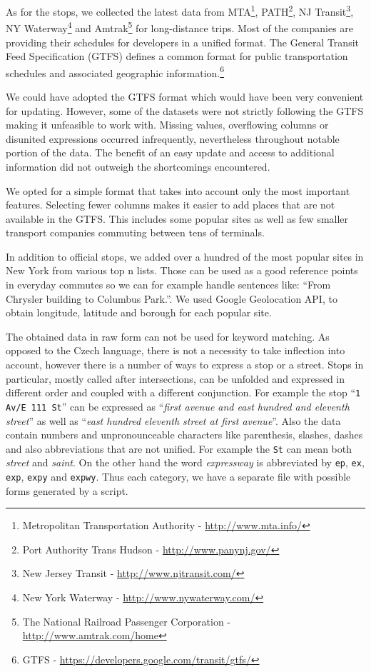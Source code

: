 As for the stops, we collected the latest data from
MTA\footnote{Metropolitan Transportation Authority - \url{http://www.mta.info/}},
PATH\footnote{Port Authority Trans Hudson - \url{http://www.panynj.gov/}},
NJ Transit\footnote{New Jersey Transit - \url{http://www.njtransit.com/}},
NY Waterway\footnote{New York Waterway - \url{http://www.nywaterway.com/}} and
Amtrak\footnote{The National Railroad Passenger Corporation - \url{http://www.amtrak.com/home}} for long-distance trips.
Most of the companies are providing their schedules for developers in a unified format.
The General Transit Feed Specification (GTFS) defines a common format for public transportation schedules and associated geographic information.\footnote{GTFS - \url{https://developers.google.com/transit/gtfs/}}

We could have adopted the GTFS format which would have been very convenient for updating.
However, some of the datasets were not strictly following the GTFS making it unfeasible to work with.
Missing values, overflowing columns or disunited expressions occurred infrequently, nevertheless throughout notable portion of the data.
The benefit of an easy update and access to additional information did not outweigh the shortcomings encountered.

We opted for a simple format that takes into account only the most important features.
Selecting fewer columns makes it easier to add places that are not available in the GTFS.
This includes some popular sites as well as few smaller transport companies commuting between tens of terminals.

In addition to official stops, we added over a hundred of the most popular sites in New York from various top n lists.
Those can be used as a good reference points in everyday commutes so we can for example handle sentences like: ``From Chrysler building to Columbus Park.''.
We used Google Geolocation API, to obtain longitude, latitude and borough for each popular site.

The obtained data in raw form can not be used for keyword matching. As opposed to the Czech language, there is not a necessity to take inflection into account, however there is a number of ways to express a stop or a street.
Stops in particular, mostly called after intersections, can be unfolded and expressed in different order and coupled with a different conjunction.
For example the stop ``\texttt{1 Av/E 111 St}'' can be expressed as ``\textit{first avenue and east hundred and eleventh street}'' as well as ``\textit{east hundred eleventh street at first avenue}''.
Also the data contain numbers and unpronounceable characters like parenthesis, slashes, dashes and also abbreviations that are not unified.
For example the \texttt{St} can mean both \textit{street} and \textit{saint}.
On the other hand the word \textit{expressway} is abbreviated by \texttt{ep}, \texttt{ex}, \texttt{exp}, \texttt{expy} and \texttt{expwy}.
Thus each category, we have a separate file with possible forms generated by a script.


